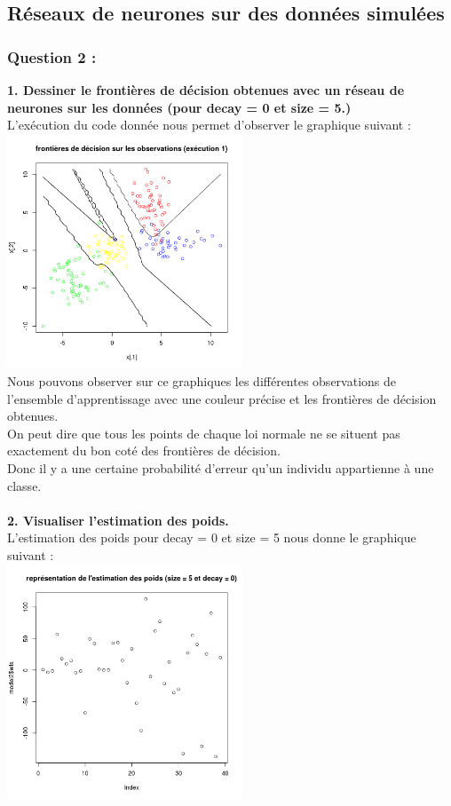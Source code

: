 \documentclass[a4paper, 10pt]{article}
\begin{document}
\subsection*{Réseaux de neurones sur des données simulées}

\subsubsection*{Question 2 :}

\textbf{1. Dessiner le frontières de décision obtenues avec un réseau de neurones sur les données (pour decay = 0 et size = 5.)}\\
L'exécution du code donnée nous permet d'observer le graphique suivant :\\
\includegraphics[height = 7cm, width = 7cm]{plots/frontiere_bayes_q2_1.png}\\
Nous pouvons observer sur ce graphiques les différentes observations de l'ensemble d'apprentissage avec une couleur précise et les frontières de décision obtenues.\\
On peut dire que tous les points de chaque loi normale ne se situent pas exactement du bon coté des frontières de décision.\\
Donc il y a une certaine probabilité d'erreur qu'un individu appartienne à une classe.\\ \\
\textbf{2. Visualiser l'estimation des poids.}\\
L'estimation des poids pour decay = 0 et size = 5 nous donne le graphique suivant :\\
\includegraphics[height = 7cm, width = 7cm]{plots/poids_q2_2_1.png}
\end{document}
